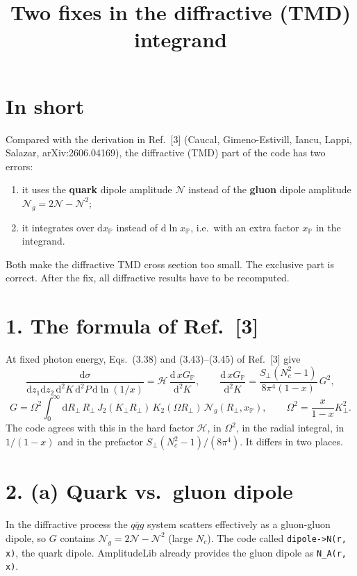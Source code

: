 \documentclass[12pt]{article}
\title{Two fixes in the diffractive (TMD) integrand}
\author{}
\date{}
\newcommand{\xpo}{x_{\mathbb{P}}}
\begin{document}
\maketitle

\section*{In short}

Compared with the derivation in Ref.~[3] (Caucal, Gimeno-Estivill, Iancu, Lappi, Salazar,
arXiv:2606.04169), the diffractive (TMD) part of the code has two errors:
\begin{enumerate}
\item[(a)] it uses the \textbf{quark} dipole amplitude $\mathcal{N}$ instead of the \textbf{gluon}
  dipole amplitude $\mathcal{N}_g=2\mathcal{N}-\mathcal{N}^2$;
\item[(b)] it integrates over $\mathrm{d}\xpo$ instead of $\mathrm{d}\ln\xpo$, i.e.\ with an extra factor
  $\xpo$ in the integrand.
\end{enumerate}
Both make the diffractive TMD cross section too small. The exclusive part is correct. After the fix,
all diffractive results have to be recomputed.

\section*{1. The formula of Ref.~[3]}

At fixed photon energy, Eqs.~(3.38) and (3.43)--(3.45) of Ref.~[3] give
\[
  \frac{\mathrm{d}\sigma}{\mathrm{d}z_1\mathrm{d}z_2\,\mathrm{d}^2K\,\mathrm{d}^2P\,\mathrm{d}\ln(1/x)}
  =\mathcal{H}\,\frac{\mathrm{d}\,xG_{\mathbb{P}}}{\mathrm{d}^2K},\qquad
  \frac{\mathrm{d}\,xG_{\mathbb{P}}}{\mathrm{d}^2K}=\frac{S_\perp(N_c^2-1)}{8\pi^4(1-x)}\,G^2,
\]
\[
  G=\Omega^2\int_0^\infty\mathrm{d}R_\perp\,R_\perp\,J_2(K_\perp R_\perp)\,K_2(\Omega R_\perp)\,
  \mathcal{N}_g(R_\perp,\xpo),\qquad \Omega^2=\frac{x}{1-x}K_\perp^2 .
\]
The code agrees with this in the hard factor $\mathcal{H}$, in $\Omega^2$, in the radial integral, in
$1/(1-x)$ and in the prefactor $S_\perp(N_c^2-1)/(8\pi^4)$. It differs in two places.

\section*{2. (a) Quark vs.\ gluon dipole}

In the diffractive process the $q\bar q g$ system scatters effectively as a gluon-gluon dipole, so $G$
contains $\mathcal{N}_g=2\mathcal{N}-\mathcal{N}^2$ (large $N_c$). The code called
\texttt{dipole->N(r, x)}, the quark dipole. AmplitudeLib already provides the gluon dipole as
\texttt{N\_A(r, x)}.
\end{document}
